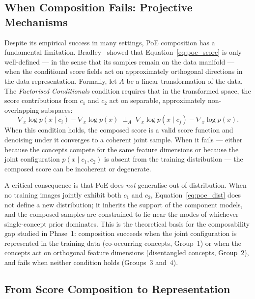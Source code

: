\subsection{When Composition Fails: Projective Mechanisms}
\label{subsec:bg_projective}

Despite its empirical success in many settings, PoE composition has a fundamental limitation.
Bradley~\citep{mechanisms2025projective} showed that Equation~\ref{eq:poe_score} is only
well-defined --- in the sense that its samples remain on the data manifold --- when the
conditional score fields act on approximately orthogonal directions in the data representation.
Formally, let $A$ be a linear transformation of the data. The \emph{Factorised Conditionals}
condition requires that in the transformed space, the score contributions from $c_1$ and $c_2$
act on separable, approximately non-overlapping subspaces:
\begin{equation}
    \nabla_x \log p(x \mid c_i) - \nabla_x \log p(x)
    \;\perp_A\;
    \nabla_x \log p(x \mid c_j) - \nabla_x \log p(x).
    \label{eq:factorised_conditionals}
\end{equation}
When this condition holds, the composed score is a valid score function and denoising under
it converges to a coherent joint sample. When it fails --- either because the concepts
compete for the same feature dimensions or because the joint configuration $p(x \mid c_1,
c_2)$ is absent from the training distribution --- the composed score can be incoherent or
degenerate.

A critical consequence is that PoE does \emph{not} generalise out of distribution. When no
training images jointly exhibit both $c_1$ and $c_2$, Equation~\ref{eq:poe_dist} does not
define a new distribution; it inherits the support of the component models, and the composed
samples are constrained to lie near the modes of whichever single-concept prior dominates.
This is the theoretical basis for the composability gap studied in Phase~1: composition
succeeds when the joint configuration is represented in the training data (co-occurring
concepts, Group~1) or when the concepts act on orthogonal feature dimensions (disentangled
concepts, Group~2), and fails when neither condition holds (Groups~3 and~4).

\subsection{From Score Composition to Representation}
\label{subsec:bg_representation}

